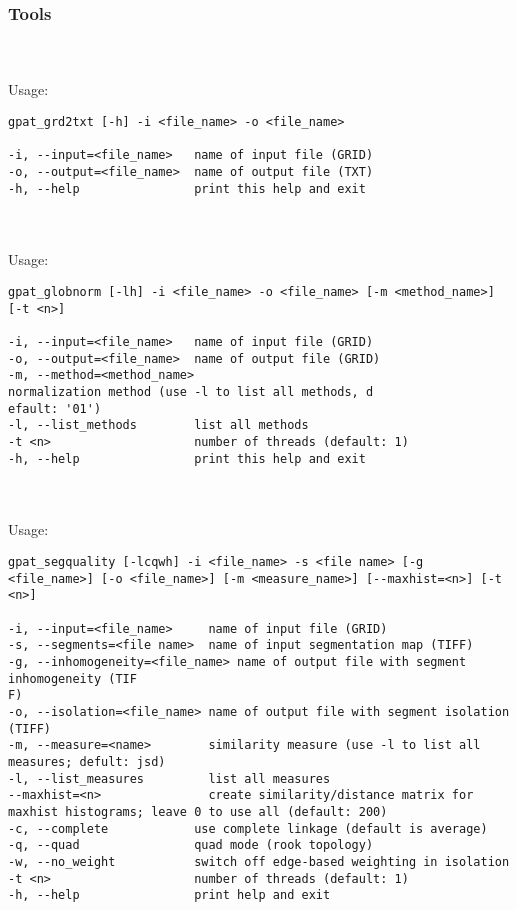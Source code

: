 \subsubsection{Tools}
{}
\\\\
Usage:

\begin{minipage}{\linewidth}
\begin{lstlisting}
gpat_grd2txt [-h] -i <file_name> -o <file_name>

-i, --input=<file_name>   name of input file (GRID)
-o, --output=<file_name>  name of output file (TXT)
-h, --help                print this help and exit
\end{lstlisting}
\end{minipage}

{}
\\\\
Usage:

\begin{minipage}{\linewidth}
\begin{lstlisting}
gpat_globnorm [-lh] -i <file_name> -o <file_name> [-m <method_name>] [-t <n>]

-i, --input=<file_name>   name of input file (GRID)
-o, --output=<file_name>  name of output file (GRID)
-m, --method=<method_name> 
normalization method (use -l to list all methods, d
efault: '01')
-l, --list_methods        list all methods
-t <n>                    number of threads (default: 1)
-h, --help                print this help and exit
\end{lstlisting}
\end{minipage}

{}
\\\\
Usage:

\begin{minipage}{\linewidth}
\begin{lstlisting}
gpat_segquality [-lcqwh] -i <file_name> -s <file name> [-g <file_name>] [-o <file_name>] [-m <measure_name>] [--maxhist=<n>] [-t <n>]

-i, --input=<file_name>     name of input file (GRID)
-s, --segments=<file name>  name of input segmentation map (TIFF)
-g, --inhomogeneity=<file_name> name of output file with segment inhomogeneity (TIF
F)
-o, --isolation=<file_name> name of output file with segment isolation (TIFF)
-m, --measure=<name>        similarity measure (use -l to list all measures; defult: jsd)
-l, --list_measures         list all measures
--maxhist=<n>               create similarity/distance matrix for maxhist histograms; leave 0 to use all (default: 200)
-c, --complete            use complete linkage (default is average)
-q, --quad                quad mode (rook topology)
-w, --no_weight           switch off edge-based weighting in isolation
-t <n>                    number of threads (default: 1)
-h, --help                print help and exit
\end{lstlisting}
\end{minipage}
